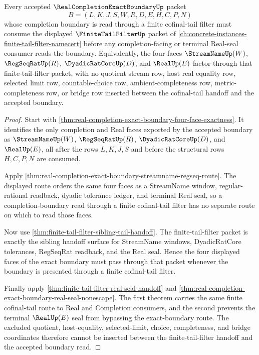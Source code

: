 \begin{theorem}
\label{thm:real-completion-exact-boundary-finite-tail-filter-handoff}
Every accepted $\RealCompletionExactBoundaryUp$ packet
$$
B=(L,K,J,S,W,R,D,E,H,C,P,N)
$$
whose completion boundary is read through a finite cofinal-tail filter must consume the displayed $\FiniteTailFilterUp$ packet of \autoref{ch:concrete-instances-finite-tail-filter-namecert} before any completion-facing or terminal Real-seal consumer reads the boundary. Equivalently, the four faces $\StreamNameUp(W)$, $\RegSeqRatUp(R)$, $\DyadicRatCoreUp(D)$, and $\RealUp(E)$ factor through that finite-tail-filter packet, with no quotient stream row, host real equality row, selected limit row, countable-choice row, ambient-completeness row, metric-completeness row, or bridge row inserted between the cofinal-tail handoff and the accepted boundary.
\end{theorem}
\begin{proof}
Start with \autoref{thm:real-completion-exact-boundary-four-face-exactness}. It identifies the only completion and Real faces exported by the accepted boundary as $\StreamNameUp(W)$, $\RegSeqRatUp(R)$, $\DyadicRatCoreUp(D)$, and $\RealUp(E)$, all after the rows $L,K,J,S$ and before the structural rows $H,C,P,N$ are consumed.

Apply \autoref{thm:real-completion-exact-boundary-streamname-regseq-route}. The displayed route orders the same four faces as a StreamName window, regular-rational readback, dyadic tolerance ledger, and terminal Real seal, so a completion-boundary read through a finite cofinal-tail filter has no separate route on which to read those faces.

Now use \autoref{thm:finite-tail-filter-sibling-tail-handoff}. The finite-tail-filter packet is exactly the sibling handoff surface for StreamName windows, DyadicRatCore tolerances, RegSeqRat readback, and the Real seal. Hence the four displayed faces of the exact boundary must pass through that packet whenever the boundary is presented through a finite cofinal-tail filter.

Finally apply \autoref{thm:finite-tail-filter-real-seal-handoff} and \autoref{thm:real-completion-exact-boundary-real-seal-nonescape}. The first theorem carries the same finite cofinal-tail route to Real and Completion consumers, and the second prevents the terminal $\RealUp(E)$ seal from bypassing the exact-boundary route. The excluded quotient, host-equality, selected-limit, choice, completeness, and bridge coordinates therefore cannot be inserted between the finite-tail-filter handoff and the accepted boundary read.
\end{proof}

